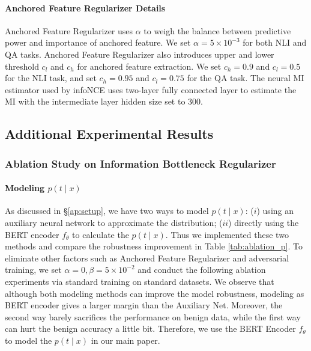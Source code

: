 \documentclass{article} \usepackage{iclr2021_conference,times}
\theoremstyle{definition}
\theoremstyle{remark}
\begin{document}
\paragraph{Anchored Feature Regularizer Details} Anchored Feature Regularizer uses $\alpha$ to weigh the balance between predictive power and importance of anchored feature. We set $\alpha=5 \times 10^{-3}$ for both NLI and QA tasks. Anchored Feature Regularizer also introduces upper and lower threshold $c_l$ and $c_h$ for anchored feature extraction. We set $c_h = 0.9$ and $c_l = 0.5$ for the NLI task, and set $c_h = 0.95$ and $c_l = 0.75$ for the QA task. The neural MI estimator used by infoNCE uses two-layer fully connected layer to estimate the MI with the intermediate layer hidden size set to $300$.









\subsection{Additional Experimental Results} \label{ap:exp}
\subsubsection{Ablation Study on Information Bottleneck Regularizer}
\paragraph{Modeling $p(t \mid x)$} As discussed in \S\ref{ap:setup}, we have two ways to model $p( t\mid x)$: ($i$) using an auxiliary neural network to approximate the distribution; ($ii$) directly using the BERT encoder $f_\theta$ to calculate the $p(t \mid x)$. Thus we implemented these two methods and compare the robustness improvement in Table \ref{tab:ablation_p}.  To eliminate other factors such as Anchored Feature Regularizer and adversarial training, we set $\alpha=0, \beta=5 \times 10^{-2}$ and conduct the following ablation experiments via standard training on standard datasets. We observe that although both modeling methods can improve the model robustness, modeling as BERT encoder gives a larger margin than the Auxiliary Net. Moreover, the second way barely sacrifices the performance on benign data, while the first way can hurt the benign accuracy a little bit. Therefore, we use the BERT Encoder $f_\theta$ to model the $p(t \mid x)$ in our main paper.
\end{document}
